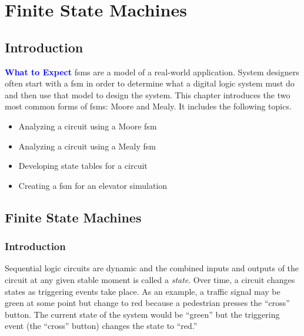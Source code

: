 \chapter{Finite State Machines}\label{ch12}
\section{Introduction}

\begin{tcolorbox}[colback=blue!5!white,colframe=blue!75!black]
	\textcolor{blue}{\textbf{What to Expect}}
	\tcblower
	\Glspl{fsm} are a model of a real-world application. System designers often start with a \gls{fsm} in order to determine what a digital logic system must do and then use that model to design the system. This chapter introduces the two most common forms of \glspl{fsm}: Moore and Mealy. It includes the following topics.
	
	\begin{itemize}
		\item Analyzing a circuit using a Moore \gls{fsm}
		\item Analyzing a circuit using a Mealy \gls{fsm}
		\item Developing state tables for a circuit
		\item Creating a \gls{fsm} for an elevator simulation
	\end{itemize}
	
\end{tcolorbox}


\section{Finite State Machines}
\label{SIM:sec:finite_state_machines}

\subsection{Introduction}
\label{SIM:subsec:intro_to_finite_state_machines}

Sequential logic circuits are dynamic and the combined inputs and outputs of the circuit at any given stable moment is called a \emph{state}. Over time, a circuit changes states as triggering events take place. As an example, a traffic signal may be green at some point but change to red because a pedestrian presses the  ``cross'' button. The current state of the system would be ``green'' but the triggering event (the ``cross'' button) changes the state to ``red.'' 

